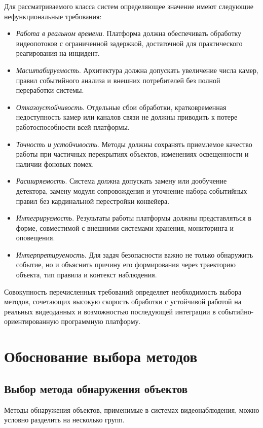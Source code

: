Для рассматриваемого класса систем определяющее значение имеют следующие нефункциональные требования:
\begin{itemize}
    \item \textit{Работа в реальном времени}. Платформа должна обеспечивать обработку видеопотоков с ограниченной задержкой, достаточной для практического реагирования на инцидент.
    \item \textit{Масштабируемость}. Архитектура должна допускать увеличение числа камер, правил событийного анализа и внешних потребителей без полной переработки системы.
    \item \textit{Отказоустойчивость}. Отдельные сбои обработки, кратковременная недоступность камер или каналов связи не должны приводить к потере работоспособности всей платформы.
    \item \textit{Точность и устойчивость}. Методы должны сохранять приемлемое качество работы при частичных перекрытиях объектов, изменениях освещенности и наличии фоновых помех.
    \item \textit{Расширяемость}. Система должна допускать замену или дообучение детектора, замену модуля сопровождения и уточнение набора событийных правил без кардинальной перестройки конвейера.
    \item \textit{Интегрируемость}. Результаты работы платформы должны представляться в форме, совместимой с внешними системами хранения, мониторинга и оповещения.
    \item \textit{Интерпретируемость}. Для задач безопасности важно не только обнаружить событие, но и объяснить причину его формирования через траекторию объекта, тип правила и контекст наблюдения.
\end{itemize}

Совокупность перечисленных требований определяет необходимость выбора методов, сочетающих высокую скорость обработки с устойчивой работой на реальных видеоданных и возможностью последующей интеграции в событийно-ориентированную программную платформу.

\section{Обоснование выбора методов}

\subsection{Выбор метода обнаружения объектов}

Методы обнаружения объектов, применимые в системах видеонаблюдения, можно условно разделить на несколько групп.

